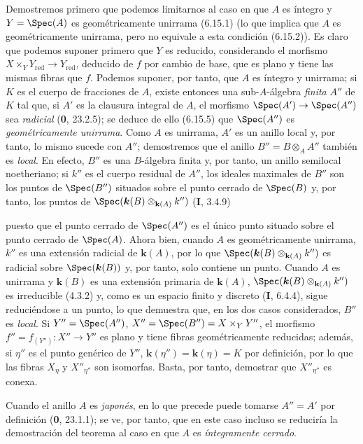 Demostremos primero que podemos limitarnos al caso en que $A$ es íntegro y $Y=\Spec(A)$ es geométricamente unirrama (6.15.1) (lo que implica que $A$ es geométricamente unirrama, pero no equivale a esta condición (6.15.2)). Es claro que podemos suponer primero que $Y$ es reducido, considerando el morfismo $X\times_Y Y_{\mathrm{red}}\to Y_{\mathrm{red}}$, deducido de $f$ por cambio de base, que es plano y tiene las mismas fibras que $f$. Podemos suponer, por tanto, que $A$ es íntegro y unirrama; si $K$ es el cuerpo de fracciones de $A$, existe entonces una sub-$A$-álgebra \emph{finita} $A''$ de $K$ tal que, si $A'$ es la clausura integral de $A$, el morfismo $\Spec(A')\to\Spec(A'')$ sea \emph{radicial} (\textbf 0, 23.2.5); se deduce de ello (6.15.5) que $\Spec(A'')$ es \emph{geométricamente unirrama}. Como $A$ es unirrama, $A'$ es un anillo local y, por tanto, lo mismo sucede con $A''$; demostremos que el anillo $B''=B\otimes_A A''$ también es \emph{local}. En efecto, $B''$ es una $B$-álgebra finita y, por tanto, un anillo semilocal noetheriano; si $k''$ es el cuerpo residual de $A''$, los ideales maximales de $B''$ son los puntos de $\Spec(B'')$ situados sobre el punto cerrado de $\Spec(B)$ y, por tanto, los puntos de $\Spec(\boldsymbol k(B)\otimes_{\mathbf k(A)}k'')$ (\textbf I, 3.4.9)


puesto que el punto cerrado de $\Spec(A'')$ es el único punto situado sobre el punto cerrado de $\Spec(A)$. Ahora bien, cuando $A$ es geométricamente unirrama, $k''$ es una extensión radicial de $\boldsymbol k(A)$, por lo que $\Spec(\boldsymbol k(B)\otimes_{\mathbf k(A)}k'')$ es radicial sobre $\Spec(\boldsymbol k(B))$ y, por tanto, solo contiene un punto. Cuando $A$ es unirrama y $\boldsymbol k(B)$ es una extensión primaria de $\boldsymbol k(A)$, $\Spec(\boldsymbol k(B)\otimes_{\mathbf k(A)}k'')$ es irreducible (4.3.2) y, como es un espacio finito y discreto (\textbf I, 6.4.4), sigue reduciéndose a un punto, lo que demuestra que, en los dos casos considerados, $B''$ es \emph{local}. Si $Y''=\Spec(A'')$, $X''=\Spec(B'')=X\times_Y Y''$, el morfismo $f''=f_{(Y'')}:X''\to Y''$ es plano y tiene fibras geométricamente reducidas; además, si $\eta''$ es el punto genérico de $Y''$, $\boldsymbol k(\eta'')=\boldsymbol k(\eta)=K$ por definición, por lo que las fibras $X_\eta$ y $X''_{\eta''}$ son isomorfas. Basta, por tanto, demostrar que $X''_{\eta''}$ es conexa.

\begin{remark}[18.9.7.1]
\label{IV.18.9.7.1}
Cuando el anillo $A$ es \emph{japonés}, en lo que precede puede tomarse $A''=A'$ por definición (\textbf 0, 23.1.1); se ve, por tanto, que en este caso incluso se reduciría la demostración del teorema al caso en que $A$ es \emph{íntegramente cerrado}.
\end{remark}

